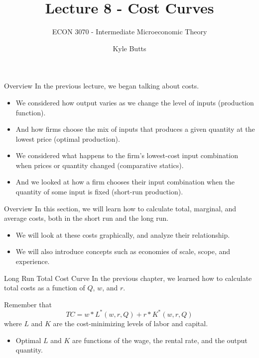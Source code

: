 \documentclass[11pt,t]{beamer}
\author{Kyle Butts}
\title{Lecture 8 - Cost Curves}
\subtitle{ECON 3070 - Intermediate Microeconomic Theory}
\begin{document}
\begin{frame}
  \titlepage
\end{frame}

\begin{frame}{Overview}
  In the previous lecture, we began talking about costs.

  \begin{itemize}
    \item We considered how output varies as we change the level of inputs (production function).
    
    \item And how firms choose the mix of inputs that produces a given quantity at the lowest price (optimal production).
    
    \item We considered what happens to the firm's lowest-cost input combination when prices or quantity changed (comparative statics).
    
    \item And we looked at how a firm chooses their input combination when the quantity of some input is fixed (short-run production).
  \end{itemize}
\end{frame}

\begin{frame}{Overview}
  In this section, we will learn how to calculate total, marginal, and average costs, both in the short run and the long run.

  \begin{itemize}
    \item We will look at these costs graphically, and analyze their relationship.
    \item We will also introduce concepts such as economies of scale, scope, and experience.
  \end{itemize}

\end{frame}

\begin{frame}{Long Run Total Cost Curve}
  In the previous chapter, we learned how to calculate total costs as a function of $Q$, $w$, and $r$.
  
  \bigskip\pause
  Remember that 
  $$
  TC = w*L^*(w,r,Q)+r*K^*(w,r,Q)
  $$
  where $L$ and $K$ are the cost-minimizing levels of labor and capital.

  \begin{itemize}
    \item Optimal $L$ and $K$ are functions of the wage, the rental rate, and the output quantity.
  \end{itemize}
  
\end{frame}
\end{document}
